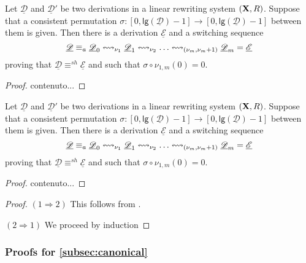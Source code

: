 \documentclass[a4paper,UKenglish,cleveref,pdftex,thm-restate,numberwithinsect,anonymous]{lipics}
\def\R{\mathsf{R}}
\def\X{\textbf {\textup{X}}}
\newcommand{\dder}[1]{\mathscr{#1}}
\newcommand{\der}[1]{\underline{\dder{#1}}}
\newcommand{\lgh}[0]{\mathsf{lg}}
\newcommand{\shift}[1]{\ensuremath{\mathrel{{\leftrightsquigarrow}_{#1}}}}
\begin{document}
\begin{lemma}\label{lem:fix1}
	Let $\der{D}$ and $\der{D}'$ be two derivations in a linear rewriting system $(\X, \R)$. Suppose that a consistent permutation $\sigma:[0, \lgh(\der{D})-1]\to [0, \lgh(\der{D})-1]$ between them is given. Then there is a derivation $\der{E}$ and a switching sequence 
	  \[\der{D}\equiv_a \der{D}_0 \shift{\nu_1} \der{D}_1 \shift{\nu_2} \ldots \shift{\transp{\nu_m}}
	\der{D}_m = \der{E}\]
proving that  $\der{D}\equiv^{sh} \der{E}$ and such that $\sigma\circ \nu_{1,m}(0)=0$.
\end{lemma}
\begin{proof}
	contenuto...
\end{proof}



\begin{lemma}\label{lem:fix2}
	Let $\der{D}$ and $\der{D}'$ be two derivations in a linear rewriting system $(\X, \R)$. Suppose that a consistent permutation $\sigma:[0, \lgh(\der{D})-1]\to [0, \lgh(\der{D})-1]$ between them is given. Then there is a derivation $\der{E}$ and a switching sequence 
	\[\der{D}\equiv_a \der{D}_0 \shift{\nu_1} \der{D}_1 \shift{\nu_2} \ldots \shift{\transp{\nu_m}}
	\der{D}_m = \der{E}\]
	proving that  $\der{D}\equiv^{sh} \der{E}$ and such that $\sigma\circ \nu_{1,m}(0)=0$.
\end{lemma}
\begin{proof}
	contenuto...
\end{proof}


\thmcoswitch*
\label{thmswitch-proof}
\begin{proof}$(1\Rightarrow 2)$ This follows from .

\smallskip \noindent $(2\Rightarrow 1)$ We proceed by induction
\end{proof}
\fi 


\subsubsection{Proofs for \cref{subsec:canonical}}




\lemIndepGlobalLeft*
\label{lemIndepGlobalLeft-proof}
\end{document}
